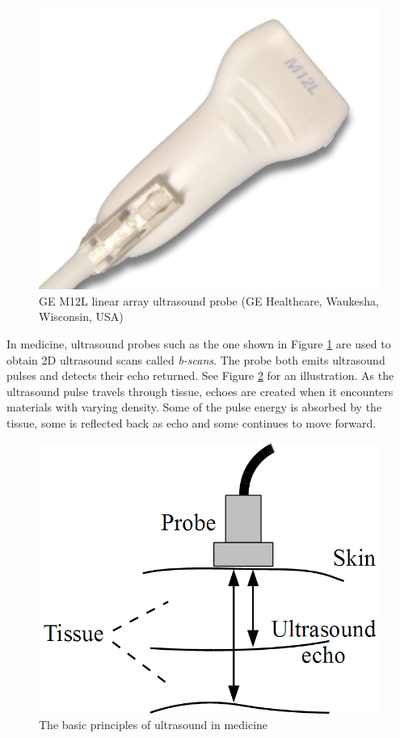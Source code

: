 	\begin{figure}[t]
		\centering
		\includegraphics[height=0.3\textheight]{graphics/ultrasound_probe.png}
		\caption[Ultrasound probe]{GE M12L linear array ultrasound probe (GE Healthcare, Waukesha, Wisconsin, USA)}
		\label{fig:ultrasound_probe}
	\end{figure}

In medicine, ultrasound probes such as the one shown in Figure \ref{fig:ultrasound_probe} are used to obtain 2D ultrasound scans called \emph{b-scans}. The probe both emits ultrasound pulses and detects their echo returned. See Figure \ref{fig:ultrasound_principle} for an illustration. As the ultrasound pulse travels through tissue, echoes are created when it encounters materials with varying density. Some of the pulse energy is absorbed by the tissue, some is reflected back as echo and some continues to move forward.
	
	\begin{figure}[b]
		\centering
		\includegraphics[height=0.25\textheight]{graphics/ultrasound_principle.png}
		\caption{The basic principles of ultrasound in medicine}
		\label{fig:ultrasound_principle}
	\end{figure}

